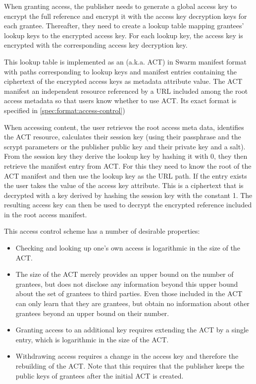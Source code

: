 When granting access, the publisher needs to generate a global access key to encrypt the full reference and encrypt it with the
access key decryption keys for each grantee. Thereafter, they need to create a lookup table mapping grantees' lookup keys to the encrypted access key. For each lookup key, the access key is encrypted with the corresponding access key decryption key.

This lookup table is implemented as an  (a.k.a. ACT) in Swarm manifest format with paths corresponding to lookup keys and manifest entries containing the ciphertext of the encrypted access keys as metadata attribute value. The ACT manifest an independent resource referenced by a URL included among the root access metadata so that users know whether to use ACT. Its exact format is specified in \ref{spec:format:access-control})

When accessing content, the user retrieves the root access meta data, identifies the ACT resource, calculates their session key (using their passphrase and the scrypt parameters or the publisher public key and their private key and a salt). From the session key they derive the lookup key by hashing it with 0, they then retrieve the manifest entry from ACT. For this they need to know the root of the ACT manifest and then use the lookup key as the URL path. If the entry exists the user takes the value of the access key attribute. This is a ciphertext that is decrypted with a key derived by hashing the session key with the constant 1. The resulting access key can then be used to decrypt the encrypted reference included in the root access manifest.

This access control scheme has a number of desirable properties:
\begin{itemize}
\item Checking and looking up one's own access is logarithmic in the size of the ACT.
\item The size of the ACT merely provides an upper bound on the number of grantees, but does not disclose any information beyond this upper bound about the set of grantees to third parties. Even those included in the ACT can only learn that they are grantees, but obtain no information about other grantees beyond an upper bound on their number.
\item Granting access to an additional key requires extending the ACT by a single entry, which is logarithmic in the size of the ACT. 
\item Withdrawing access requires a change in the access key and therefore the rebuilding of the ACT. Note that this requires that the publisher keeps the public keys of grantees after the initial ACT is created.
\end{itemize}

